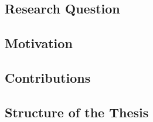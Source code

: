 
\subsection{Research Question}

\subsection{Motivation}

\subsection{Contributions}

\subsection{Structure of the Thesis}

